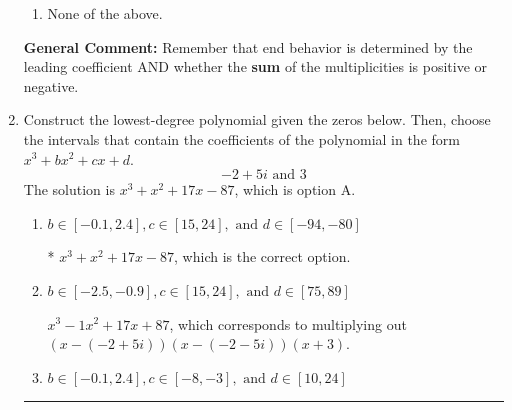 \documentclass{extbook}[14pt]
\newcommand{\litem}[1]{\item #1

\rule{\textwidth}{0.4pt}}
\begin{document}
\begin{enumerate}
{\begin{enumerate}[label=\Alph*.]
\item None of the above.\end{enumerate}
\textbf{General Comment:} Remember that end behavior is determined by the leading coefficient AND whether the \textbf{sum} of the multiplicities is positive or negative.
}
\litem{
Construct the lowest-degree polynomial given the zeros below. Then, choose the intervals that contain the coefficients of the polynomial in the form $x^3+bx^2+cx+d$.
\[ -2 + 5 i \text{ and } 3 \]The solution is \( x^{3} + x^{2} +17 x -87 \), which is option A.\begin{enumerate}[label=\Alph*.]
\item \( b \in [-0.1, 2.4], c \in [15, 24], \text{ and } d \in [-94, -80] \)

* $x^{3} + x^{2} +17 x -87$, which is the correct option.
\item \( b \in [-2.5, -0.9], c \in [15, 24], \text{ and } d \in [75, 89] \)

$x^{3} -1 x^{2} +17 x + 87$, which corresponds to multiplying out $(x-(-2 + 5 i))(x-(-2 - 5 i))(x + 3)$.
\item \( b \in [-0.1, 2.4], c \in [-8, -3], \text{ and } d \in [10, 24] \)


\end{enumerate}}
\end{enumerate}
\end{document}
